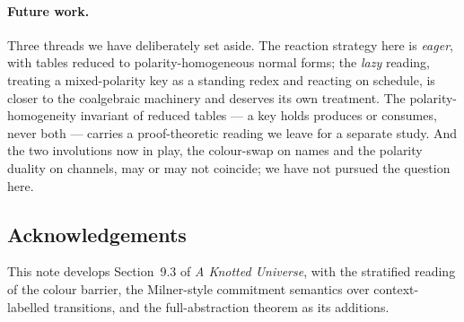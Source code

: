 \documentclass[11pt]{article}
\theoremstyle{plain}
\theoremstyle{definition}
\begin{document}
\paragraph{Future work.} Three threads we have deliberately set aside. The reaction
strategy here is \emph{eager}, with tables reduced to polarity-homogeneous normal
forms; the \emph{lazy} reading, treating a mixed-polarity key as a standing redex
and reacting on schedule, is closer to the coalgebraic machinery and deserves its
own treatment. The polarity-homogeneity invariant of reduced tables --- a key holds
produces or consumes, never both --- carries a proof-theoretic reading we leave for
a separate study. And the two involutions now in play, the colour-swap on names and
the polarity duality on channels, may or may not coincide; we have not pursued the
question here.

\subsection*{Acknowledgements}
This note develops Section~9.3 of \emph{A Knotted Universe}, with the stratified
reading of the colour barrier, the Milner-style commitment semantics over
context-labelled transitions, and the full-abstraction theorem as its additions.
\end{document}
